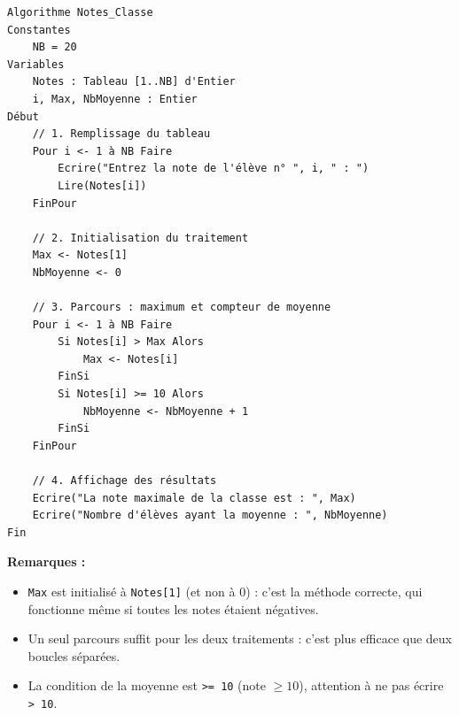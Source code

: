 \documentclass[11pt]{article}
\begin{document}
\begin{corrige}
\begin{lstlisting}
Algorithme Notes_Classe
Constantes
    NB = 20
Variables
    Notes : Tableau [1..NB] d'Entier
    i, Max, NbMoyenne : Entier
Début
    // 1. Remplissage du tableau
    Pour i <- 1 à NB Faire
        Ecrire("Entrez la note de l'élève n° ", i, " : ")
        Lire(Notes[i])
    FinPour

    // 2. Initialisation du traitement
    Max <- Notes[1]
    NbMoyenne <- 0

    // 3. Parcours : maximum et compteur de moyenne
    Pour i <- 1 à NB Faire
        Si Notes[i] > Max Alors
            Max <- Notes[i]
        FinSi
        Si Notes[i] >= 10 Alors
            NbMoyenne <- NbMoyenne + 1
        FinSi
    FinPour

    // 4. Affichage des résultats
    Ecrire("La note maximale de la classe est : ", Max)
    Ecrire("Nombre d'élèves ayant la moyenne : ", NbMoyenne)
Fin
\end{lstlisting}

\textbf{Remarques :}
\begin{itemize}
    \item \texttt{Max} est initialisé à \texttt{Notes[1]} (et non à 0) : c'est la méthode correcte, qui fonctionne même si toutes les notes étaient négatives.
    \item Un seul parcours suffit pour les deux traitements : c'est plus efficace que deux boucles séparées.
    \item La condition de la moyenne est \texttt{>= 10} (note $\ge 10$), attention à ne pas écrire \texttt{> 10}.
\end{itemize}
\end{corrige}
\end{document}
